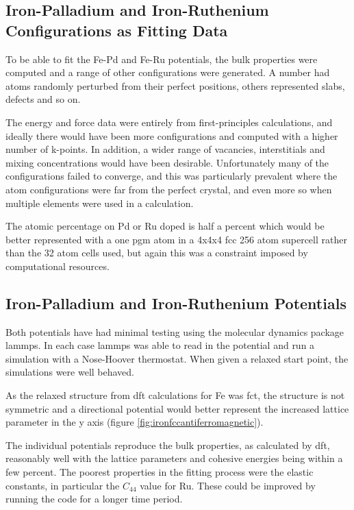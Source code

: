 \subsection{Iron-Palladium and Iron-Ruthenium Configurations as Fitting Data}

To be able to fit the Fe-Pd and Fe-Ru potentials, the bulk properties were computed and a range of other configurations were generated.  A number had atoms randomly perturbed from their perfect positions, others represented slabs, defects and so on.

The energy and force data were entirely from first-principles calculations, and ideally there would have been more configurations and computed with a higher number of k-points.  In addition, a wider range of vacancies, interstitials and mixing concentrations would have been desirable.  Unfortunately many of the configurations failed to converge, and this was particularly prevalent where the atom configurations were far from the perfect crystal, and even more so when multiple elements were used in a calculation.

The atomic percentage on Pd or Ru doped is half a percent which would be better represented with a one \acrshort{pgm} atom in a 4x4x4 \acrshort{fcc} 256 atom supercell rather than the 32 atom cells used, but again this was a constraint imposed by computational resources.


\subsection{Iron-Palladium and Iron-Ruthenium Potentials}

Both potentials have had minimal testing using the molecular dynamics package \acrshort{lammps}.  In each case \acrshort{lammps} was able to read in the potential and run a simulation with a Nose-Hoover thermostat.  When given a relaxed start point, the simulations were well behaved.

As the relaxed structure from \acrshort{dft} calculations for Fe was \acrshort{fct}, the structure is not symmetric and a directional potential would better represent the increased lattice parameter in the y axis (figure \ref{fig:ironfccantiferromagnetic}).  

The individual potentials reproduce the bulk properties, as calculated by \acrshort{dft}, reasonably well with the lattice parameters and cohesive energies being within a few percent.  The poorest properties in the fitting process were the elastic constants, in particular the $C_{44}$ value for Ru.  These could be improved by running the code for a longer time period.

